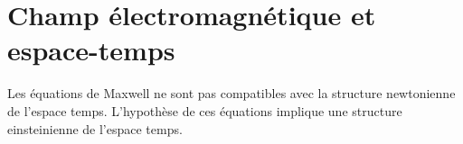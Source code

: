 
\section{Champ électromagnétique et espace-temps}
%
Les équations de Maxwell ne sont pas compatibles avec la structure newtonienne de l'espace temps. L'hypothèse de ces équations implique une structure einsteinienne de l'espace temps.



